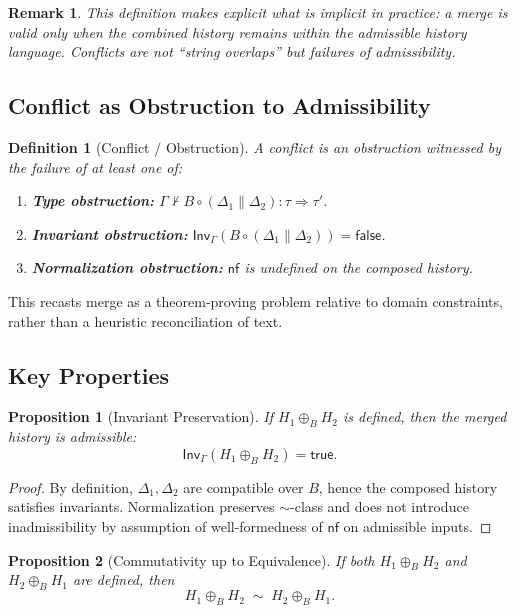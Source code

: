 \documentclass[11pt]{article}
\newtheorem{definition}{Definition}
\newtheorem{remark}{Remark}
\newtheorem{proposition}{Proposition}
\begin{document}
\begin{remark}
This definition makes explicit what is implicit in practice: a merge is valid only when the combined history remains within the admissible history language. Conflicts are not ``string overlaps'' but failures of admissibility.
\end{remark}

\subsection{Conflict as Obstruction to Admissibility}

\begin{definition}[Conflict / Obstruction]
A \emph{conflict} is an obstruction witnessed by the failure of at least one of:
\begin{enumerate}
  \item \textbf{Type obstruction:} $\Gamma \nvdash B \circ (\Delta_1 \parallel \Delta_2) : \tau \Rightarrow \tau'$.
  \item \textbf{Invariant obstruction:} $\mathsf{Inv}_\Gamma(B \circ (\Delta_1 \parallel \Delta_2))=\mathsf{false}$.
  \item \textbf{Normalization obstruction:} $\mathsf{nf}$ is undefined on the composed history.
\end{enumerate}
\end{definition}

This recasts merge as a theorem-proving problem relative to domain constraints, rather than a heuristic reconciliation of text.

\subsection{Key Properties}

\begin{proposition}[Invariant Preservation]
If $H_1 \oplus_B H_2$ is defined, then the merged history is admissible:
\[
\mathsf{Inv}_\Gamma(H_1 \oplus_B H_2)=\mathsf{true}.
\]
\end{proposition}

\begin{proof}
By definition, $\Delta_1,\Delta_2$ are compatible over $B$, hence the composed history satisfies invariants. Normalization preserves $\sim$-class and does not introduce inadmissibility by assumption of well-formedness of $\mathsf{nf}$ on admissible inputs.
\end{proof}

\begin{proposition}[Commutativity up to Equivalence]
If both $H_1 \oplus_B H_2$ and $H_2 \oplus_B H_1$ are defined, then
\[
H_1 \oplus_B H_2 \;\sim\; H_2 \oplus_B H_1.
\]
\end{proposition}
\end{document}
